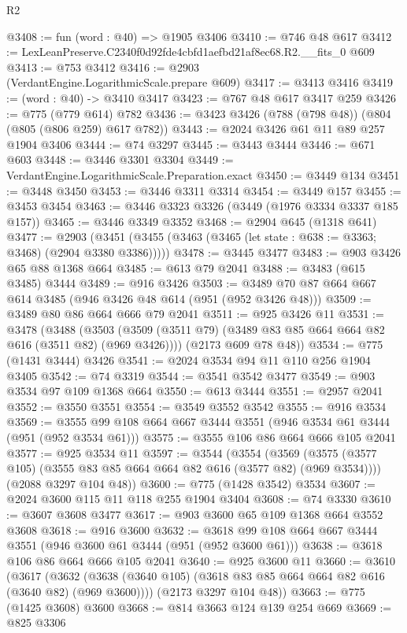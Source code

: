 \begin{lexlean}{R2}
\begin{coremodule}
@3408 := fun (word : @40) => @1905 @3406
@3410 := @746 @48 @617
@3412 := LexLeanPreserve.C2340f0d92fde4cbfd1aefbd21af8ec68.R2.__fits_0 @609
@3413 := @753 @3412
@3416 := @2903 (VerdantEngine.LogarithmicScale.prepare @609)
@3417 := @3413 @3416
@3419 := (word : @40) -> @3410 @3417
@3423 := @767 @48 @617 @3417 @259
@3426 := @775 (@779 @614) @782
@3436 := @3423 @3426 (@788 (@798 @48)) (@804 (@805 (@806 @259) @617 @782))
@3443 := @2024 @3426 @61 @11 @89 @257 @1904 @3406
@3444 := @74 @3297
@3445 := @3443 @3444
@3446 := @671 @603
@3448 := @3446 @3301 @3304
@3449 := VerdantEngine.LogarithmicScale.Preparation.exact
@3450 := @3449 @134
@3451 := @3448 @3450
@3453 := @3446 @3311 @3314
@3454 := @3449 @157
@3455 := @3453 @3454
@3463 := @3446 @3323 @3326 (@3449 (@1976 @3334 @3337 @185 @157))
@3465 := @3446 @3349 @3352
@3468 := @2904 @645 (@1318 @641)
@3477 := @2903
    (@3451 (@3455 (@3463 (@3465 (let state : @638 := @3363; @3468) (@2904 @3380 @3386)))))
@3478 := @3445 @3477
@3483 := @903 @3426 @65 @88 @1368 @664
@3485 := @613 @79 @2041
@3488 := @3483 (@615 @3485) @3444
@3489 := @916 @3426
@3503 := @3489 @70 @87 @664 @667 @614 @3485 (@946 @3426 @48 @614 (@951 (@952 @3426 @48)))
@3509 := @3489 @80 @86 @664 @666 @79 @2041
@3511 := @925 @3426 @11
@3531 := @3478
    (@3488
      (@3503 (@3509 (@3511 @79) (@3489 @83 @85 @664 @664 @82 @616 (@3511 @82) (@969 @3426))))
      (@2173 @609 @78 @48))
@3534 := @775 (@1431 @3444) @3426
@3541 := @2024 @3534 @94 @11 @110 @256 @1904 @3405
@3542 := @74 @3319
@3544 := @3541 @3542 @3477
@3549 := @903 @3534 @97 @109 @1368 @664
@3550 := @613 @3444
@3551 := @2957 @2041
@3552 := @3550 @3551
@3554 := @3549 @3552 @3542
@3555 := @916 @3534
@3569 := @3555 @99 @108 @664 @667 @3444 @3551 (@946 @3534 @61 @3444 (@951 (@952 @3534 @61)))
@3575 := @3555 @106 @86 @664 @666 @105 @2041
@3577 := @925 @3534 @11
@3597 := @3544
    (@3554
      (@3569 (@3575 (@3577 @105) (@3555 @83 @85 @664 @664 @82 @616 (@3577 @82) (@969 @3534))))
      (@2088 @3297 @104 @48))
@3600 := @775 (@1428 @3542) @3534
@3607 := @2024 @3600 @115 @11 @118 @255 @1904 @3404
@3608 := @74 @3330
@3610 := @3607 @3608 @3477
@3617 := @903 @3600 @65 @109 @1368 @664 @3552 @3608
@3618 := @916 @3600
@3632 := @3618 @99 @108 @664 @667 @3444 @3551 (@946 @3600 @61 @3444 (@951 (@952 @3600 @61)))
@3638 := @3618 @106 @86 @664 @666 @105 @2041
@3640 := @925 @3600 @11
@3660 := @3610
    (@3617
      (@3632 (@3638 (@3640 @105) (@3618 @83 @85 @664 @664 @82 @616 (@3640 @82) (@969 @3600))))
      (@2173 @3297 @104 @48))
@3663 := @775 (@1425 @3608) @3600
@3668 := @814 @3663 @124 @139 @254 @669
@3669 := @825 @3306

\end{coremodule}
\end{lexlean}
